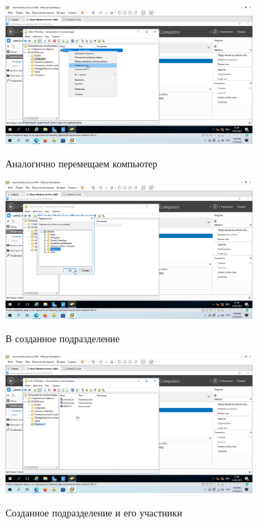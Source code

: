 \documentclass[a4paper]{article}
\begin{document}
  \begin{figure}[H]
    \centering
    \includegraphics[width=0.85\textwidth]{5_0104}
    \label{img:104}
    \caption{Аналогично перемещаем компьютер}
  \end{figure}

  \begin{figure}[H]
    \centering
    \includegraphics[width=0.85\textwidth]{5_0105}
    \label{img:105}
    \caption{В созданное подразделение}
  \end{figure}

  \begin{figure}[H]
    \centering
    \includegraphics[width=0.85\textwidth]{5_0106}
    \label{img:106}
    \caption{Созданное подразделение и его участники}
  \end{figure}
\end{document}
